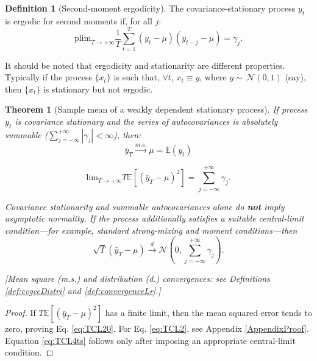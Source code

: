\documentclass[
  11pt,
]{book}
\newtheorem{theorem}{Theorem}[chapter]
\theoremstyle{definition}
\newtheorem{definition}{Definition}[chapter]
\theoremstyle{definition}
\theoremstyle{definition}
\theoremstyle{definition}
\theoremstyle{remark}
\begin{document}
\begin{definition}[Second-moment ergodicity]
\protect\hypertarget{def:ergod2nd}{}\label{def:ergod2nd}The covariance-stationary process \(y_t\) is ergodic for second moments if, for all \(j\):
\[
\mbox{plim}_{T \rightarrow +\infty} \frac{1}{T}\sum_{t=1}^T (y_t-\mu) (y_{t-j}-\mu) = \gamma_j.
\]
\end{definition}

It should be noted that ergodicity and stationarity are different properties. Typically if the process \(\{x_t\}\) is such that, \(\forall t\), \(x_t \equiv y\), where \(y \sim\,\mathcal{N}(0,1)\) (say), then \(\{x_t\}\) is stationary but not ergodic.

\begin{theorem}[Sample mean of a weakly dependent stationary process]
\protect\hypertarget{thm:CLTcovstat}{}\label{thm:CLTcovstat}If process \(y_t\) is covariance stationary and the series of autocovariances is absolutely summable (\(\sum_{j=-\infty}^{+\infty} |\gamma_j| <\infty\)), then:
\begin{equation}
\bar{y}_T \overset{m.s.}{\rightarrow} \mu = \mathbb{E}(y_t) \label{eq:TCL20}
\end{equation}

\begin{equation}
\mbox{lim}_{T \rightarrow +\infty} T \mathbb{E}\left[(\bar{y}_T - \mu)^2\right] = \sum_{j=-\infty}^{+\infty} \gamma_j. \label{eq:TCL2}
\end{equation}

Covariance stationarity and summable autocovariances alone do \textbf{not} imply asymptotic normality. If the process additionally satisfies a suitable central-limit condition---for example, standard strong-mixing and moment conditions---then
\begin{equation}
\sqrt{T}(\bar{y}_T - \mu) \overset{d}{\rightarrow} \mathcal{N}\left(0,\sum_{j=-\infty}^{+\infty} \gamma_j \right). \label{eq:TCL4ts}
\end{equation}

{[}Mean square (m.s.) and distribution (d.) convergences: see Definitions \ref{def:cvgceDistri} and \ref{def:convergenceLr}.{]}
\end{theorem}

\begin{proof}
If \(T\mathbb E[(\bar y_T-\mu)^2]\) has a finite limit, then the mean squared error tends to zero, proving Eq. \eqref{eq:TCL20}. For Eq. \eqref{eq:TCL2}, see Appendix \ref{AppendixProof}. Equation \eqref{eq:TCL4ts} follows only after imposing an appropriate central-limit condition.
\end{proof}
\end{document}
